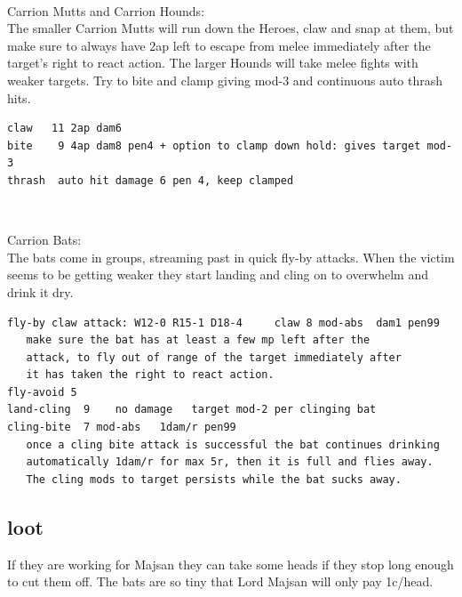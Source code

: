 \

Carrion Mutts and Carrion Hounds:\\
The smaller Carrion Mutts will run down the Heroes, claw and snap at them, but make sure to always have 2ap left to escape from melee immediately after the target's right to react action.
The larger Hounds will take melee fights with weaker targets. Try to bite and clamp giving mod-3 and continuous auto thrash hits.
\small \begin{verbatim}
claw   11 2ap dam6
bite    9 4ap dam8 pen4 + option to clamp down hold: gives target mod-3
thrash  auto hit damage 6 pen 4, keep clamped
\end{verbatim} \normalsize

\

Carrion Bats:\\
The bats come in groups, streaming past in quick fly-by attacks. When the victim seems to be getting weaker they start landing and cling on to overwhelm and drink it dry.
\small \begin{verbatim}
fly-by claw attack: W12-0 R15-1 D18-4     claw 8 mod-abs  dam1 pen99
   make sure the bat has at least a few mp left after the
   attack, to fly out of range of the target immediately after
   it has taken the right to react action.
fly-avoid 5
land-cling  9    no damage   target mod-2 per clinging bat
cling-bite  7 mod-abs   1dam/r pen99
   once a cling bite attack is successful the bat continues drinking
   automatically 1dam/r for max 5r, then it is full and flies away.
   The cling mods to target persists while the bat sucks away.
\end{verbatim} \normalsize


\subsection*{loot}
If they are working for Majsan they can take some heads if they stop long enough to cut them off. The bats are so tiny that Lord Majsan will only pay 1c/head.











\clearpage
{}
